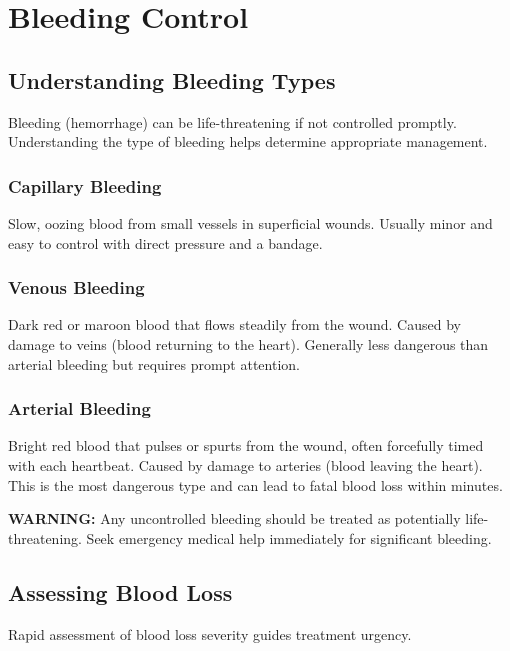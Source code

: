 \chapter{Bleeding Control}\label{ch:bleeding}

\section{Understanding Bleeding Types}

Bleeding (hemorrhage) can be life-threatening if not controlled promptly. Understanding the type of bleeding helps determine appropriate management.

\subsection{Capillary Bleeding}

Slow, oozing blood from small vessels in superficial wounds. Usually minor and easy to control with direct pressure and a bandage.

\subsection{Venous Bleeding}

Dark red or maroon blood that flows steadily from the wound. Caused by damage to veins (blood returning to the heart). Generally less dangerous than arterial bleeding but requires prompt attention.

\subsection{Arterial Bleeding}

Bright red blood that pulses or spurts from the wound, often forcefully timed with each heartbeat. Caused by damage to arteries (blood leaving the heart). This is the most dangerous type and can lead to fatal blood loss within minutes.

\textbf{WARNING:} Any uncontrolled bleeding should be treated as potentially life-threatening. Seek emergency medical help immediately for significant bleeding.

\section{Assessing Blood Loss}

Rapid assessment of blood loss severity guides treatment urgency.


